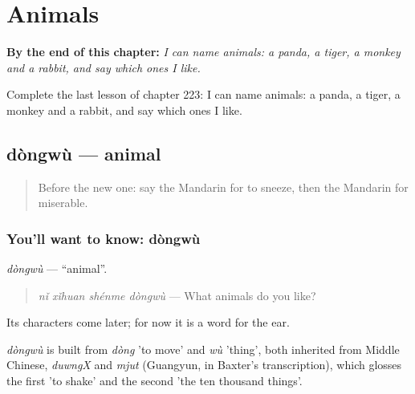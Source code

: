
\chapter{Animals}
\label{ch:zh-animals}

\begin{chapteropening}
\textbf{By the end of this chapter:} \emph{I can name animals: a panda, a tiger, a monkey and a rabbit, and say which ones I like.}

Complete the last lesson of chapter 223: I can name animals: a panda, a tiger, a monkey and a rabbit, and say which ones I like.
\end{chapteropening}

\section[dòngwù]{dòngwù — animal}

\label{lesson:ZH-C223-dongwu}



\begin{quote}
Before the new one: say the Mandarin for to sneeze, then the Mandarin for miserable.
\end{quote}

\subsection*{You'll want to know: dòngwù}
\emph{dòngwù} — \textquotedblleft{}animal\textquotedblright{}.

\begin{quote}
\emph{nǐ xǐhuan shénme dòngwù} — What animals do you like?
\end{quote}

Its characters come later; for now it is a word for the ear.

\begin{cousinweb}
\emph{dòngwù} is built from \emph{dòng} 'to move' and \emph{wù} 'thing', both inherited from Middle Chinese, \emph{duwngX} and \emph{mjut} (Guangyun, in Baxter's transcription), which glosses the first 'to shake' and the second 'the ten thousand things'.
\end{cousinweb}

